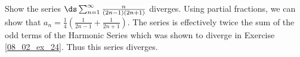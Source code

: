 {Show the series $\ds \sum_{n=1}^\infty \frac{n}{(2n-1)(2n+1)}$ diverges.
}
{Using partial fractions, we can show that $a_n = \frac14\left(\frac1{2n-1}+\frac{1}{2n+1}\right)$. The series is effectively twice the sum of the odd terms of the Harmonic Series which was shown to diverge in Exercise \ref{08_02_ex_24}. Thus this series diverges.
}
